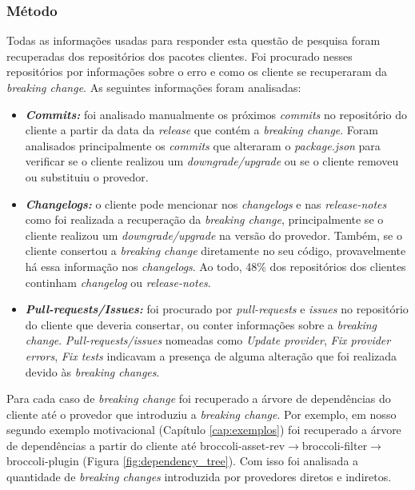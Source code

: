 \subsubsection{Método}
\label{sec:qp3:approach}
Todas as informações usadas para responder esta questão de pesquisa foram recuperadas dos repositórios dos pacotes clientes. Foi procurado nesses repositórios por informações sobre o erro e como os cliente se recuperaram da \textit{breaking change}. As seguintes informações foram analisadas:

\begin{itemize}
    \item \textbf{\textit{Commits:}} foi analisado manualmente os próximos \textit{commits} no repositório do cliente a partir da data da \textit{release} que contém a \textit{breaking change}. Foram analisados principalmente os \textit{commits} que alteraram o \textit{package.json} para verificar se o cliente realizou um \textit{downgrade/upgrade} ou se o cliente removeu ou substituiu o provedor.

    \item \textbf{\textit{Changelogs:}} o cliente pode mencionar nos \textit{changelogs} e nas \textit{release-notes} como foi realizada a recuperação da \textit{breaking change}, principalmente se o cliente realizou um \textit{downgrade/upgrade} na versão do provedor. Também, se o cliente consertou a \textit{breaking change} diretamente no seu código, provavelmente há essa informação nos \textit{changelogs}. Ao todo, 48\% dos repositórios dos clientes continham \textit{changelog} ou \textit{release-notes}.
    
    \item \textbf{\textit{Pull-requests/Issues:}} foi procurado por \textit{pull-requests} e \textit{issues} no repositório do cliente que deveria consertar, ou conter informações sobre a \textit{breaking change}. \textit{Pull-requests/issues} nomeadas como \textit{Update provider}, \textit{Fix provider errors}, \textit{Fix tests} indicavam a presença de alguma alteração que foi realizada devido às \textit{breaking changes}.
\end{itemize}

Para cada caso de \textit{breaking change} foi recuperado a árvore de dependências do cliente até o provedor que introduziu a \textit{breaking change}. Por exemplo, em nosso segundo exemplo motivacional (Capítulo \ref{cap:exemplos}) foi recuperado a árvore de dependências a partir do cliente até \textsf{broccoli-asset-rev$\rightarrow$broccoli-filter$\rightarrow$broccoli-plugin} (Figura \ref{fig:dependency_tree}). Com isso foi analisada a quantidade de \textit{breaking changes} introduzida por provedores diretos e indiretos. 

